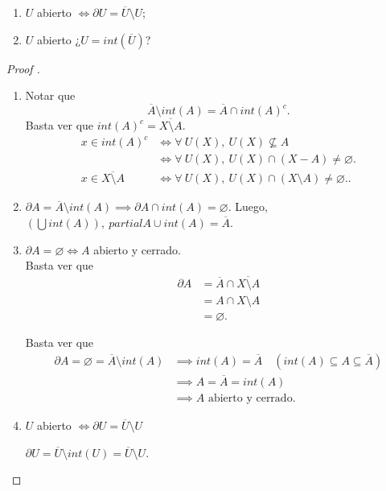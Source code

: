 \documentclass[a4paper]{report}
\begin{document}
\begin{enumerate}
\begin{enumerate}
		\item $U$ abierto $\iff \partial U = \overline{U} \setminus U$;

		\item $U$ abierto ¿$U = int(\overline{U})$?
	\end{enumerate}
	\begin{proof}[Proof ]
		\begin{enumerate}
			\item Notar que
			\[
			\overline{A} \setminus int(A) = \overline{A} \cap int(A)^c.
			\]
			Basta ver que $int(A)^c = \overline{X \setminus A}$.
			\begin{align*}
				x \in int(A)^c & \iff \forall \ U(X),\ U(X) \not\subseteq A \\
				& \iff \forall \ U(X),\ U(X) \cap (X-A) \neq \varnothing. \\
				x \in \overline{X \setminus A} & \iff \forall \ U(X),\ U(X) \cap (X \setminus A) \neq \varnothing.
			.\end{align*}

			\item $\partial A = \overline{A} \setminus int(A) \implies \partial A \cap int(A) = \varnothing$. Luego, $(\bigcup int(A)),\ partial A \cup int(A) = \overline{A}$.

			\item $\partial A = \varnothing \iff A$ abierto y cerrado.\\
			\Onlyifstep Basta ver que \begin{align*}
				\partial A & = \overline{A} \cap \overline{X \setminus A} \\
				& = A \cap X \setminus A \\
				& = \varnothing.
			\end{align*}

			\Ifstep Basta ver que
			\begin{align*}
				\partial A = \varnothing = \overline{A}\setminus int(A) & \implies int(A) = \overline{A} \quad (int(A) \subseteq A \subseteq \overline{A}) \\
				& \implies A = \overline{A} = int(A) \\
				& \implies A \text{ abierto y cerrado}
			.\end{align*}

			\item $U$ abierto $\iff \partial U = \overline{U} \setminus U$

			\Onlyifstep $\partial U = \overline{U} \setminus int(U) = \overline{U} \setminus U$.


\end{enumerate}
\end{proof}
\end{enumerate}
\end{document}
